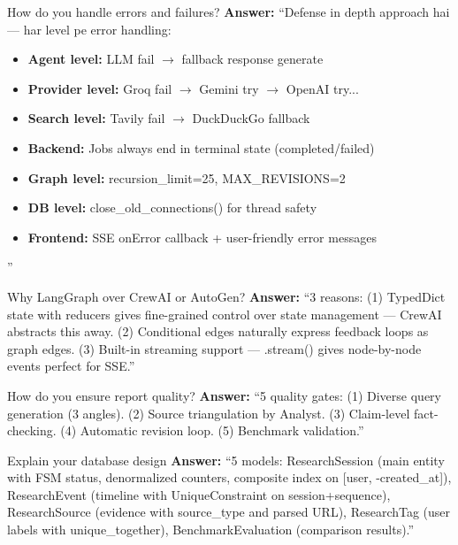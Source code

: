 \documentclass[11pt,a4paper,twoside]{report}
\begin{document}
\begin{interviewbox}{How do you handle errors and failures?}
\textbf{Answer:} ``Defense in depth approach hai --- har level pe error handling:
\begin{itemize}
    \item \textbf{Agent level:} LLM fail $\rightarrow$ fallback response generate
    \item \textbf{Provider level:} Groq fail $\rightarrow$ Gemini try $\rightarrow$ OpenAI try...
    \item \textbf{Search level:} Tavily fail $\rightarrow$ DuckDuckGo fallback
    \item \textbf{Backend:} Jobs always end in terminal state (completed/failed)
    \item \textbf{Graph level:} recursion\_limit=25, MAX\_REVISIONS=2
    \item \textbf{DB level:} close\_old\_connections() for thread safety
    \item \textbf{Frontend:} SSE onError callback + user-friendly error messages
\end{itemize}''
\end{interviewbox}

\begin{interviewbox}{Why LangGraph over CrewAI or AutoGen?}
\textbf{Answer:} ``3 reasons: (1) TypedDict state with reducers gives fine-grained control over state management --- CrewAI abstracts this away. (2) Conditional edges naturally express feedback loops as graph edges. (3) Built-in streaming support --- .stream() gives node-by-node events perfect for SSE.''
\end{interviewbox}

\begin{interviewbox}{How do you ensure report quality?}
\textbf{Answer:} ``5 quality gates: (1) Diverse query generation (3 angles). (2) Source triangulation by Analyst. (3) Claim-level fact-checking. (4) Automatic revision loop. (5) Benchmark validation.''
\end{interviewbox}

\begin{interviewbox}{Explain your database design}
\textbf{Answer:} ``5 models: ResearchSession (main entity with FSM status, denormalized counters, composite index on [user, -created\_at]), ResearchEvent (timeline with UniqueConstraint on session+sequence), ResearchSource (evidence with source\_type and parsed URL), ResearchTag (user labels with unique\_together), BenchmarkEvaluation (comparison results).''
\end{interviewbox}
\end{document}
